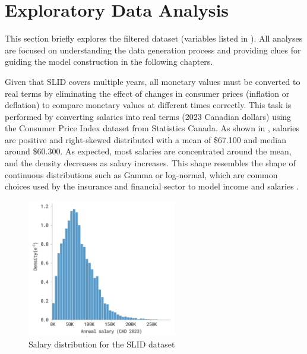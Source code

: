 



\section{Exploratory Data Analysis}\label{section:eda}

This section briefly explores the filtered dataset (variables listed in ). All analyses are focused on understanding the data generation process and providing clues for guiding the model construction in the following chapters. 

Given that SLID covers multiple years, all monetary values must be converted to real terms by eliminating the effect of changes in consumer prices (inflation or deflation) to compare monetary values at different times correctly. This task is performed by converting salaries into real terms (2023 Canadian dollars) using the Consumer Price Index dataset from Statistics Canada. As shown in , salaries are positive and right-skewed distributed with a mean of \$67.100 and median around \$60.300. As expected, most salaries are concentrated around the mean, and the density decreases as salary increases. This shape resembles the shape of continuous distributions such as Gamma or log-normal, which are common choices used by the insurance and financial sector to model income and salaries \citep{Nielsen2010}.

\begin{figure}[H]
    \centering
    \includegraphics[width=0.58\textwidth]{images/ch4_salary_dist/salary_dist.png}
    \setlength{\abovecaptionskip}{-6pt}
    \caption{Salary distribution for the SLID dataset}
    \label{fig:salary_distribution}
\end{figure}



